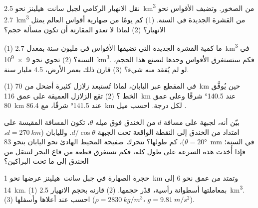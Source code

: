 \begin{exercise}[$\star\star$]\label{exo:g12:subduction-magmatism:9}
نقل الانهيار الركامي لجبل سانت~هيلينز نحو \qty{2.5}{km^3} من
الصخور. وتضيف الأقواس نحو \qty{2.7}{km^3} من القشرة الجديدة في السنة. (1) كم يومًا
من صهارية أقواس العالم يمثل الانهيار؟ (2) لماذا لا تعدو
المقارنة أن تكون مسألة حجم؟
\end{exercise}

\begin{exercise}[$\star\star$]\label{exo:g12:subduction-magmatism:10}
(1) ما كمية القشرة الجديدة التي تضيفها الأقواس في مليون سنة بمعدل \qty{2.7}{km^3} في
السنة؟ (2) تحوي  نحو \qty{9e9}{km^3}. فكم ستستغرق
الأقواس وحدها لتصنع هذا الحجم، لو لم يُفقد منه شيء؟ (3) قارن ذلك
بعمر الأرض، 4.5 مليار سنة.
\end{exercise}

\begin{exercise}[$\star\star$]\label{exo:g12:subduction-magmatism:11}
(1) في المقطع عبر اليابان، لماذا تُستبعد زلازل كثيرة أضحل من
\qty{70}{km} حين يُوفَّق الخط ؟ (2) تقع الزلازل العميقة
على عمق \qty{116}{km} عند \ang{140.5} شرقًا وعلى عمق \qty{80}{km} عند \ang{141.5} شرقًا، مع
\qty{86.4}{km} لكل درجة. احسب ميل .
\end{exercise}

\begin{exercise}[$\star\star\star$]\label{exo:g12:subduction-magmatism:12}
بيّن أنه، لجبهة على مسافة $d$ من الخندق فوق  ميله
$\theta$، تكون المسافة المقيسة على امتداد  من الخندق إلى النقطة
الواقعة تحت الجبهة $d/\cos\theta$. ولليابان ($d = \qty{270}{km}$،
$\theta = \ang{20}$)، كم طولها؟ تتحرك صفيحة المحيط الهادئ نحو
اليابان بنحو \qty{83}{mm} في السنة؛ فإذا أُخذت هذه السرعة على طول  كله، فكم
تستغرق قطعة من قاع البحر لتنتقل من الخندق إلى ما تحت
البراكين؟
\end{exercise}

\begin{exercise}[$\star\star\star$]\label{exo:g12:subduction-magmatism:13}
حجرة الصهارة في جبل سانت~هيلينز عرضها نحو \qty{1}{km} وتمتد
من عمق نحو 6 إلى \qty{14}{km}. (1) بمعاملتها أسطوانة رأسية،
قدّر حجمها. (2) قارنه بحجم الانهيار \qty{2.5}{km^3}.
(3) احسب  عند أعلاها وأسفلها ($\rho =
\qty{2830}{kg/m^3}$، $g = \qty{9.81}{m/s^2}$).
\end{exercise}

